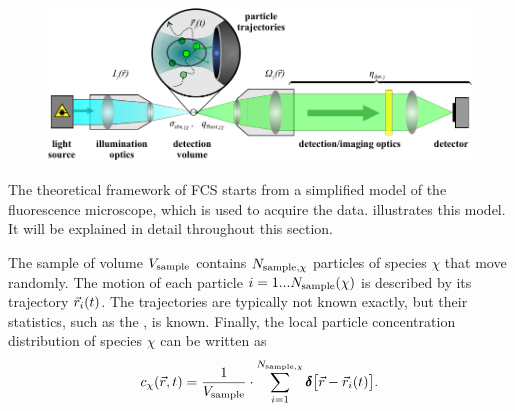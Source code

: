 \begin{figure}[t!]
	\centering
		\includegraphics{pic/fcs_microscopeschematic.pdf}
	\label{fig:fcs_microscopeschematic}
\end{figure}

The theoretical framework of FCS starts from a simplified model of the fluorescence microscope, which is used to acquire the data.  illustrates this model. It will be explained in detail throughout this section.

The sample of volume $V_{\text{sample}}$ contains $N_{{\text{sample}},\chi}$ particles of species $\chi$ that move randomly. The motion of each particle $i=1...N_{\text{sample}}(\chi)$ is described by its trajectory $\vec{r}_i(t)$. The trajectories are typically not known exactly, but their statistics, such as the , is known. Finally, the local particle concentration distribution of species $\chi$ can be written as
\begin{equation}\label{eq:fcstheory_concentration}
  c_\chi(\vec{r},t)=\frac{1}{V_{\text{sample}}}\cdot\sum\limits_{i=1}^{N_{{\text{sample}},\chi}}\pmb{\delta}\bigl[\vec{r}-\vec{r}_i(t)\bigr].
\end{equation}

